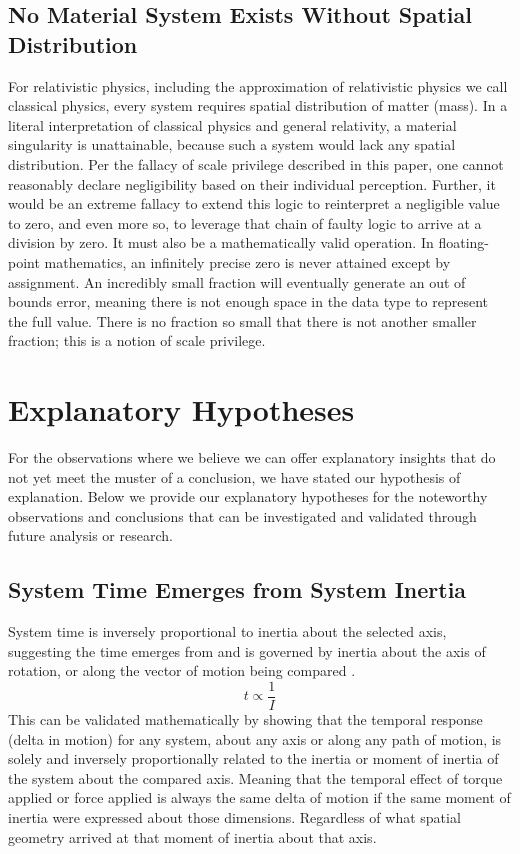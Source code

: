 \documentclass[twoside,twocolumn,9pt,fleqn]{article}
\begin{document}
\subsection{No Material System Exists Without Spatial Distribution}
For relativistic physics, including the approximation of relativistic physics we call classical physics, every system requires spatial distribution of matter (mass). In a literal interpretation of classical physics and general relativity, a material singularity is unattainable, because such a system would lack any spatial distribution. Per the fallacy of scale privilege described in this paper, one cannot reasonably declare negligibility based on their individual perception. Further, it would be an extreme fallacy to extend this logic to reinterpret a negligible value to zero, and even more so, to leverage that chain of faulty logic to arrive at a division by zero. It must also be a mathematically valid operation. In floating-point mathematics, an infinitely precise zero is never attained except by assignment. An incredibly small fraction will eventually generate an out of bounds error, meaning there is not enough space in the data type to represent the full value. There is no fraction so small that there is not another smaller fraction; this is a notion of scale privilege.

\section{Explanatory Hypotheses}
For the observations where we believe we can offer explanatory insights that do not yet meet the muster of a conclusion, we have stated our hypothesis of explanation. Below we provide our explanatory hypotheses for the noteworthy observations and conclusions that can be investigated and validated through future analysis or research.

\subsection{System Time Emerges from System Inertia}
System time is inversely proportional to inertia about the selected axis, suggesting the time emerges from and is governed by inertia about the axis of rotation, or along the vector of motion being compared \cite{degerlia202501}.
\begin{equation}
t \propto \frac{1}{I}
\end{equation}
This can be validated mathematically by showing that the temporal response (delta in motion) for any system, about any axis or along any path of motion, is solely and inversely proportionally related to the inertia or moment of inertia of the system about the compared axis. Meaning that the temporal effect of torque applied or force applied is always the same delta of motion if the same moment of inertia were expressed about those dimensions. Regardless of what spatial geometry arrived at that moment of inertia about that axis.
\end{document}
